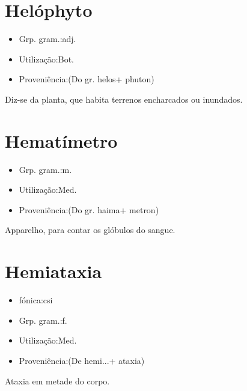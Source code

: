 \documentclass{article}
\begin{document}
\section{Helóphyto}
\begin{itemize}
\item {Grp. gram.:adj.}
\end{itemize}
\begin{itemize}
\item {Utilização:Bot.}
\end{itemize}
\begin{itemize}
\item {Proveniência:(Do gr. \textunderscore helos\textunderscore  + \textunderscore phuton\textunderscore )}
\end{itemize}
Diz-se da planta, que habita terrenos encharcados ou inundados.
\section{Hematímetro}
\begin{itemize}
\item {Grp. gram.:m.}
\end{itemize}
\begin{itemize}
\item {Utilização:Med.}
\end{itemize}
\begin{itemize}
\item {Proveniência:(Do gr. \textunderscore haima\textunderscore  + \textunderscore metron\textunderscore )}
\end{itemize}
Apparelho, para contar os glóbulos do sangue.
\section{Hemiataxia}
\begin{itemize}
\item {fónica:csi}
\end{itemize}
\begin{itemize}
\item {Grp. gram.:f.}
\end{itemize}
\begin{itemize}
\item {Utilização:Med.}
\end{itemize}
\begin{itemize}
\item {Proveniência:(De \textunderscore hemi...\textunderscore  + \textunderscore ataxia\textunderscore )}
\end{itemize}
Ataxia em metade do corpo.
\end{document}
